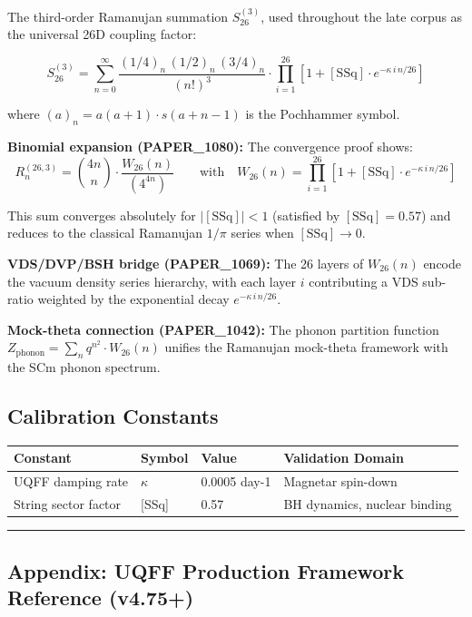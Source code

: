 \documentclass[
  11pt,
]{article}
\newcounter{none} %
\begin{document}
The third-order Ramanujan summation $S_{26}^{(3)}$, used throughout
the late corpus as the universal 26D coupling factor:

\[S_{26}^{(3)} = \sum_{n=0}^{\infty} \frac{(1/4)_n\,(1/2)_n\,(3/4)_n}{(n!)^3} \cdot \prod_{i=1}^{26}\left[1 + [\text{SSq}]\cdot e^{-\kappa\,i\,n/26}\right]\]

where $(a)_n = a(a+1)\cdot s(a+n-1)$ is the Pochhammer symbol.

\textbf{Binomial expansion (PAPER\_1080):} The convergence proof shows:
\[R_n^{(26,3)} = \binom{4n}{n} \cdot \frac{W_{26}(n)}{(4^{4n})} \qquad \text{with}\quad W_{26}(n) = \prod_{i=1}^{26}\left[1 + [\text{SSq}]\cdot e^{-\kappa\,i\,n/26}\right]\]

This sum converges absolutely for $|[\text{SSq}]| < 1$ (satisfied by
$[\text{SSq}] = 0.57$) and reduces to the classical Ramanujan
$1/\pi$ series when $[\text{SSq}] \to 0$.

\textbf{VDS/DVP/BSH bridge (PAPER\_1069):} The 26 layers of
$W_{26}(n)$ encode the vacuum density series hierarchy, with each
layer $i$ contributing a VDS sub-ratio weighted by the exponential
decay $e^{-\kappa\,i\,n/26}$.

\textbf{Mock-theta connection (PAPER\_1042):} The phonon partition
function $Z_{\text{phonon}} = \sum_n q^{n^2} \cdot W_{26}(n)$ unifies
the Ramanujan mock-theta framework with the SCm phonon spectrum.

\subsection{Calibration Constants}\label{calibration-constants-1}

{\def\LTcaptype{none} %
\begin{longtable}[]{@{}llll@{}}
\toprule\noalign{}
Constant & Symbol & Value & Validation Domain \\
\midrule\noalign{}
\endhead
\bottomrule\noalign{}
\endlastfoot
UQFF damping rate & $\kappa$ & 0.0005 day-1 & Magnetar spin-down \\
String sector factor & {[}SSq{]} & 0.57 & BH dynamics, nuclear
binding \\
\end{longtable}
}

\begin{center}\rule{0.5\linewidth}{0.5pt}\end{center}

\subsection{Appendix: UQFF Production Framework Reference
(v4.75+)}\label{appendix-uqff-production-framework-reference-v4.75}
\end{document}
